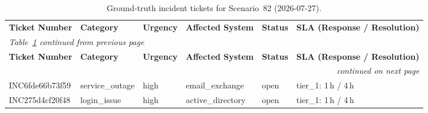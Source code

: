 {\small\begin{longtable}{
  p{}
  p{}
  p{}
  p{}
  p{}
  p{}}
\captionsetup{font=small}
\caption{Ground-truth incident tickets for Scenario~82 (2026-07-27).}
\label{tab:scenario82-tickets} \\
\toprule
\textbf{Ticket Number} &
\textbf{Category} &
\textbf{Urgency} &
\textbf{Affected System} &
\textbf{Status} &
\textbf{SLA (Response / Resolution)} \\
\midrule
\endfirsthead
\multicolumn{6}{l}{\emph{Table~\ref{tab:scenario82-tickets} continued from previous page}} \\
\toprule
\textbf{Ticket Number} &
\textbf{Category} &
\textbf{Urgency} &
\textbf{Affected System} &
\textbf{Status} &
\textbf{SLA (Response / Resolution)} \\
\midrule
\endhead
\midrule \multicolumn{6}{r}{\emph{continued on next page}} \\
\endfoot
\bottomrule
\endlastfoot

INC6fde66b73f59 & service\_outage & high & email\_exchange   & open & tier\_1: 1\,h / 4\,h \\
INC275d4cf20f48 & login\_issue    & high & active\_directory & open & tier\_1: 1\,h / 4\,h \\

\end{longtable}}